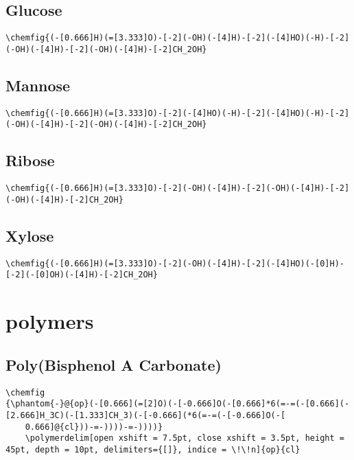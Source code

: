 \section{Glucose}\label{app:glucose}
\begin{lstlisting}
\chemfig{(-[0.666]H)(=[3.333]O)-[-2](-OH)(-[4]H)-[-2](-[4]HO)(-H)-[-2](-OH)(-[4]H)-[-2](-OH)(-[4]H)-[-2]CH_2OH}
\end{lstlisting}

\section{Mannose}\label{app:mannose}
\begin{lstlisting}
\chemfig{(-[0.666]H)(=[3.333]O)-[-2](-[4]HO)(-H)-[-2](-[4]HO)(-H)-[-2](-OH)(-[4]H)-[-2](-OH)(-[4]H)-[-2]CH_2OH}
\end{lstlisting}

\section{Ribose}\label{app:ribose}
\begin{lstlisting}
\chemfig{(-[0.666]H)(=[3.333]O)-[-2](-OH)(-[4]H)-[-2](-OH)(-[4]H)-[-2](-OH)(-[4]H)-[-2]CH_2OH}
\end{lstlisting}

\section{Xylose}\label{app:xylose}
\begin{lstlisting}
\chemfig{(-[0.666]H)(=[3.333]O)-[-2](-OH)(-[4]H)-[-2](-[4]HO)(-[0]H)-[-2](-[0]OH)(-[4]H)-[-2]CH_2OH}
\end{lstlisting}



\chapter{polymers}\label{app:polymers}


\section{Poly(Bisphenol A Carbonate)}\label{app:poly(bisphenol-a-carbonate)}
\begin{lstlisting}
\chemfig
{\phantom{-}@{op}(-[0.666](=[2]O)(-[-0.666]O(-[0.666]*6(=-=(-[0.666](-[2.666]H_3C)(-[1.333]CH_3)(-[-0.666](*6(=-=(-[-0.666]O(-[
    0.666]@{cl}))-=-))))-=-))))}
    \polymerdelim[open xshift = 7.5pt, close xshift = 3.5pt, height = 45pt, depth = 10pt, delimiters={[]}, indice = \!\!n]{op}{cl}
\end{lstlisting}


